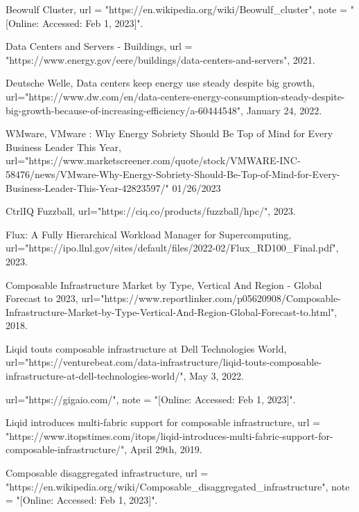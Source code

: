 \documentclass[conference]{IEEEtran}
\begin{document}
\begin{thebibliography}{20}


  Beowulf Cluster,
  url = "https://en.wikipedia.org/wiki/Beowulf_cluster",
  note = "[Online: Accessed: Feb 1, 2023]".

  Data Centers and Servers - Buildings,
  url = "https://www.energy.gov/eere/buildings/data-centers-and-servers",
  2021.
  
  Deutsche Welle,
  Data centers keep energy use steady despite big growth,
  url="https://www.dw.com/en/data-centers-energy-consumption-steady-despite-big-growth-because-of-increasing-efficiency/a-60444548",
  January 24, 2022.
  
  WMware,
  VMware : Why Energy Sobriety Should Be Top of Mind for Every Business Leader This Year,
  url="https://www.marketscreener.com/quote/stock/VMWARE-INC-58476/news/VMware-Why-Energy-Sobriety-Should-Be-Top-of-Mind-for-Every-Business-Leader-This-Year-42823597/"
  01/26/2023
  
  CtrlIQ Fuzzball,
  url="https://ciq.co/products/fuzzball/hpc/",
  2023.
  
  Flux:  A Fully Hierarchical Workload Manager for Supercomputing,
  url="https://ipo.llnl.gov/sites/default/files/2022-02/Flux_RD100_Final.pdf",
  2023. 
  
  Composable Infrastructure Market by Type, Vertical And Region - Global Forecast to 2023,
  url="https://www.reportlinker.com/p05620908/Composable-Infrastructure-Market-by-Type-Vertical-And-Region-Global-Forecast-to.html",
  2018.
  
  Liqid touts composable infrastructure at Dell Technologies World,
  url="https://venturebeat.com/data-infrastructure/liqid-touts-composable-infrastructure-at-dell-technologies-world/",
  May 3, 2022.
  
  url="https://gigaio.com/",
  note = "[Online: Accessed: Feb 1, 2023]". 
  
  Liqid introduces multi-fabric support for composable infrastructure,
  url = "https://www.itopstimes.com/itops/liqid-introduces-multi-fabric-support-for-composable-infrastructure/",
  April 29th, 2019.
  
  Composable disaggregated infrastructure,
  url = "https://en.wikipedia.org/wiki/Composable_disaggregated_infrastructure",
  note = "[Online: Accessed: Feb 1, 2023]".


\end{thebibliography}
\end{document}
